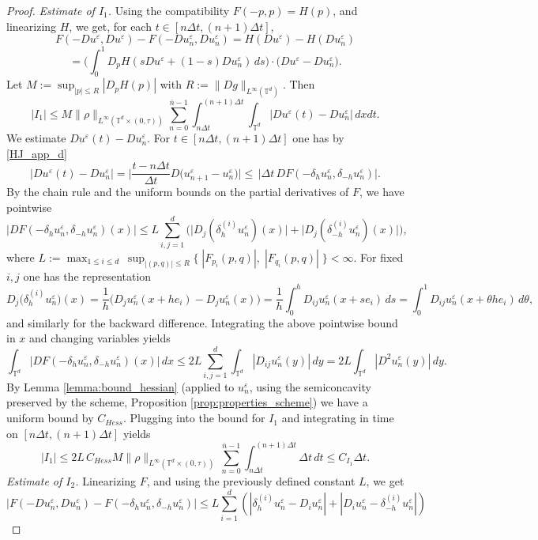 \documentclass[11pt]{amsart}
\theoremstyle{remark}
\theoremstyle{definition}
\theoremstyle{Claim}
\newcommand{\T}{{\mathbb{T}}}
\theoremstyle{plain}
\begin{document}
\begin{proof}
\emph{Estimate of \(I_1\).}
Using the compatibility \(F(-p,p)=H(p)\), and linearizing \(H\), we get, for each \(t\in[n\Delta t,(n+1)\Delta t]\),
\[
F(-D u^\varepsilon, D u^\varepsilon)-F(-D u^\varepsilon_n, D u^\varepsilon_n)
=H(D u^\varepsilon)-H(D u^\varepsilon_n)\]\[
=\Big(\int_0^1 D_pH(sD u^\varepsilon+(1-s)D u^\varepsilon_n)\,ds\Big)\cdot\big(D u^\varepsilon-D u^\varepsilon_n\big).
\]
Let \(M:=\sup_{|p|\le R}|D_pH(p)|\) with \(R:= \|Dg\|_{L^\infty(\T^d)}\). Then
\[
|I_1|\le M\|\rho\|_{L^\infty(\T^d\times(0,\tau))}\sum_{n=0}^{\bar n-1}\int_{n\Delta t}^{(n+1)\Delta t}\int_{\T^d}|D u^\varepsilon(t)-D u^\varepsilon_n|\,dxdt.
\]
We estimate \(D u^\varepsilon(t)-D u^\varepsilon_n\). For \(t\in[n\Delta t,(n+1)\Delta t]\) one has
by \eqref{HJ_app_d}
\[
\big|D u^\varepsilon(t)-D u^\varepsilon_n\big|
=\bigg|\frac{t-n\Delta t}{\Delta t}D\big(u^\varepsilon_{n+1}- u^\varepsilon_n\big)
\bigg|\leq\,\big|\Delta t\,DF(-\delta_h u^\varepsilon_n,\delta_{-h} u^\varepsilon_n)\big|.
\]
By the chain rule and the uniform bounds on the partial derivatives of $F$, we have pointwise
\[
\big|D F(-\delta_h u^\varepsilon_n,\delta_{-h} u^\varepsilon_n)(x)\big|
\le L\sum_{i,j=1}^d\Big(\big|D_{j}(\delta_h^{(i)}u^\varepsilon_n)(x)\big|
+\big|D_{j}(\delta_{-h}^{(i)}u^\varepsilon_n)(x)\big|\Big),
\]
where $L:=\max_{1\le i\le d}\ \sup_{|(p,q)|\le R}\Big\{\;|F_{p_i}(p,q)|,\;|F_{q_i}(p,q)|\;\Big\}<\infty.$ For fixed $i,j$ one has the representation
\[
D_j\big(\delta_h^{(i)} u^\varepsilon_n\big)(x)=\frac{1}{h}\bigg(D_j u^\varepsilon_n(x + h e_i) - D_j u^\varepsilon_n(x)\bigg)
= \frac{1}{h}\int_0^h D_{ij} u^\varepsilon_n(x + s e_i)\,ds
= \int_0^1 D_{ij} u^\varepsilon_n(x + \theta h e_i)\,d\theta,
\]
and similarly for the backward difference. Integrating the above pointwise bound in $x$ and changing variables yields
\[
\int_{\T^d}\big|D F(-\delta_h u^\varepsilon_n,\delta_{-h} u^\varepsilon_n)(x)\big|\,dx
\le 2L\sum_{i,j=1}^d\int_{\T^d}|D_{ij}u^\varepsilon_n(y)|\,dy
=2L\int_{\T^d}|D^2 u^\varepsilon_n(y)|\,dy.
\]
By Lemma \ref{lemma:bound_hessian} (applied to $u^\varepsilon_n$, using the semiconcavity preserved by the scheme, Proposition \ref{prop:properties_scheme}) we have a uniform bound by $C_{Hess}$. Plugging into the bound for \(I_1\) and integrating in time on \([n\Delta t,(n+1)\Delta t]\) yields
\[
|I_1|\le 2L\,C_{Hess}M\|\rho\|_{L^\infty(\T^d\times(0,\tau))}\,\sum_{n=0}^{\bar n-1}\int_{n\Delta t}^{(n+1)\Delta t}\Delta t\,dt
\leq C_{I_1}\Delta t.
\]
\emph{Estimate of \(I_2\).}
Linearizing \(F\), and using the previously defined constant $L$, we get 
\[
|F(-D u^\varepsilon_n, D u^\varepsilon_n)-F(-\delta_h u^\varepsilon_n,\delta_{-h} u^\varepsilon_n)|\leq L \sum_{i=1}^d(|\delta_h^{(i)}u^\varepsilon_n-D_{i}u^\varepsilon_n|+|D_{i}u^\varepsilon_n-\delta_{-h}^{(i)}u^\varepsilon_n|)
\]
\end{proof}
\end{document}
